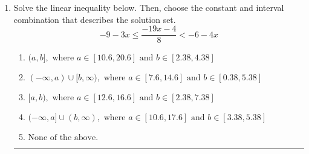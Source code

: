 \documentclass[14pt]{extbook}
\newcommand{\litem}[1]{\item#1\hspace*{-1cm}\rule{\textwidth}{0.4pt}}
\begin{document}
\begin{enumerate}
{\begin{enumerate}[label=\Alph*.]
\end{enumerate} }
\litem{
Solve the linear inequality below. Then, choose the constant and interval combination that describes the solution set.\[ -9 - 3 x \leq \frac{-19 x - 4}{8} < -6 - 4 x \]\begin{enumerate}[label=\Alph*.]
\item \( (a, b], \text{ where } a \in [10.6, 20.6] \text{ and } b \in [2.38, 4.38] \)
\item \( (-\infty, a) \cup [b, \infty), \text{ where } a \in [7.6, 14.6] \text{ and } b \in [0.38, 5.38] \)
\item \( [a, b), \text{ where } a \in [12.6, 16.6] \text{ and } b \in [2.38, 7.38] \)
\item \( (-\infty, a] \cup (b, \infty), \text{ where } a \in [10.6, 17.6] \text{ and } b \in [3.38, 5.38] \)
\item \( \text{None of the above.} \)

\end{enumerate} }
\end{enumerate}
\end{document}
